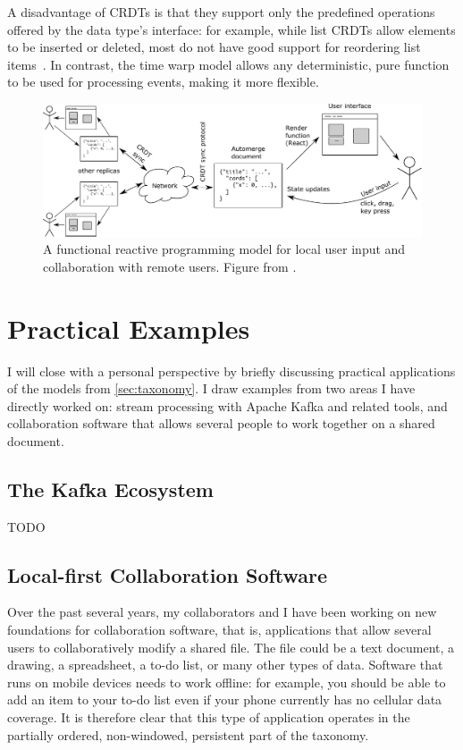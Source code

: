 \documentclass[sigconf]{acmart}
\begin{document}
A disadvantage of CRDTs is that they support only the predefined operations offered by the data type's interface: for example, while list CRDTs allow elements to be inserted or deleted, most do not have good support for reordering list items~\cite{Kleppmann:2020}.
In contrast, the time warp model allows any deterministic, pure function to be used for processing events, making it more flexible.

\begin{figure}
\centering
\includegraphics{document-frp.pdf}
\caption{A functional reactive programming model for local user input and collaboration with remote users. Figure from \cite{vanHardenberg:2020}.}
\label{fig:pushpin}
\end{figure}

\section{Practical Examples}

I will close with a personal perspective by briefly discussing practical applications of the models from \autoref{sec:taxonomy}.
I draw examples from two areas I have directly worked on: stream processing with Apache Kafka and related tools, and collaboration software that allows several people to work together on a shared document.

\subsection{The Kafka Ecosystem}

TODO

\subsection{Local-first Collaboration Software}

Over the past several years, my collaborators and I have been working on new foundations for collaboration software, that is, applications that allow several users to collaboratively modify a shared file.
The file could be a text document, a drawing, a spreadsheet, a to-do list, or many other types of data.
Software that runs on mobile devices needs to work offline: for example, you should be able to add an item to your to-do list even if your phone currently has no cellular data coverage.
It is therefore clear that this type of application operates in the partially ordered, non-windowed, persistent part of the taxonomy.
\end{document}
